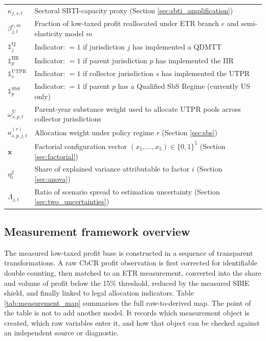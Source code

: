 \documentclass[11pt,a4paper]{article}
\begin{document}
\begin{table}[H]
\begin{tabular}{@{}ll@{}}
$\kappa_{j,s,t}$ & Sectoral SBTI-capacity proxy (Section \ref{sec:sbti_amplification}) \\
$\beta_{j,t}^{e,m}$ & Fraction of low-taxed profit reallocated under ETR branch $e$ and semi-elasticity model $m$ \\
$\mathbb{1}_j^{\text{Q}}$ & Indicator: $=1$ if jurisdiction $j$ has implemented a QDMTT \\
$\mathbb{1}_p^{\text{IIR}}$ & Indicator: $=1$ if parent jurisdiction $p$ has implemented the IIR \\
$\mathbb{1}_s^{\text{UTPR}}$ & Indicator: $=1$ if collector jurisdiction $s$ has implemented the UTPR \\
$\mathbb{1}_p^{\text{SbS}}$ & Indicator: $=1$ if parent $p$ has a Qualified SbS Regime (currently US only) \\
$\omega_{s,p,t}^{\text{U}}$ & Parent-year substance weight used to allocate UTPR pools across collector jurisdictions \\
$a_{s,p,j,t}^{(r)}$ & Allocation weight under policy regime $r$ (Section \ref{sec:sbs}) \\
$\mathbf{x}$ & Factorial configuration vector $(x_1, \ldots, x_5) \in \{0,1\}^5$ (Section \ref{sec:factorial}) \\
$\eta_i^2$ & Share of explained variance attributable to factor $i$ (Section \ref{sec:anova}) \\
$\Lambda_{j,t}$ & Ratio of scenario spread to estimation uncertainty (Section \ref{sec:two_uncertainties}) \\
\bottomrule
\end{tabular}
\end{table}

\newpage 

\subsection{Measurement framework overview}\label{sec:measurement_framework}

The measured low-taxed profit base is constructed in a sequence of transparent transformations. A raw CbCR profit observation is first corrected for identifiable double counting, then matched to an ETR measurement, converted into the share and volume of profit below the 15\% threshold, reduced by the measured SBIE shield, and finally linked to legal allocation indicators. Table \ref{tab:measurement_map} summarises the full raw-to-derived map. The point of the table is not to add another model. It records which measurement object is created, which raw variables enter it, and how that object can be checked against an independent source or diagnostic.
\end{document}
